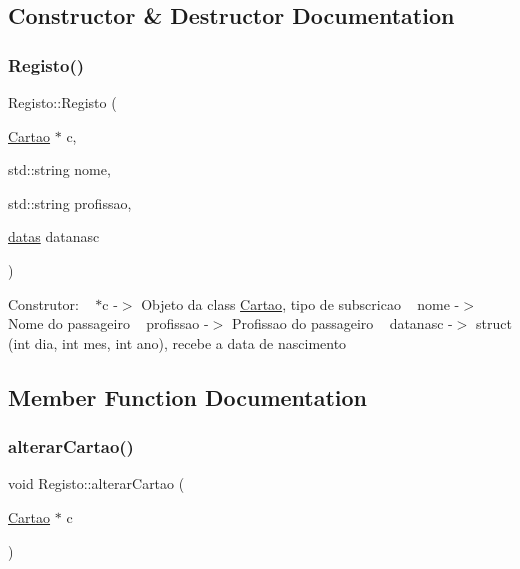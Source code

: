 \subsection{Constructor \& Destructor Documentation}
\mbox{\label{class_registo_a1dca6558d473be328a35cc844dccbbc4}} 
\subsubsection{\texorpdfstring{Registo()}{Registo()}}
{\footnotesize\ttfamily Registo\+::\+Registo (\begin{DoxyParamCaption}\item[{\mbox{\hyperlink{class_cartao}{Cartao}} $\ast$}]{c,  }\item[{std\+::string}]{nome,  }\item[{std\+::string}]{profissao,  }\item[{\mbox{\hyperlink{structdatas}{datas}}}]{datanasc }\end{DoxyParamCaption})}

Construtor\+: ~\newline
$\ast$c -\/$>$ Objeto da class \mbox{\hyperlink{class_cartao}{Cartao}}, tipo de subscricao ~\newline
nome -\/$>$ Nome do passageiro ~\newline
profissao -\/$>$ Profissao do passageiro ~\newline
datanasc -\/$>$ struct (int dia, int mes, int ano), recebe a data de nascimento ~\newline


\subsection{Member Function Documentation}
\mbox{\label{class_registo_a3d4ce2f7e25614391d1bbe2750fafaaf}} 
\subsubsection{\texorpdfstring{alterar\+Cartao()}{alterarCartao()}}
{\footnotesize\ttfamily void Registo\+::alterar\+Cartao (\begin{DoxyParamCaption}\item[{\mbox{\hyperlink{class_cartao}{Cartao}} $\ast$}]{c }\end{DoxyParamCaption})}

